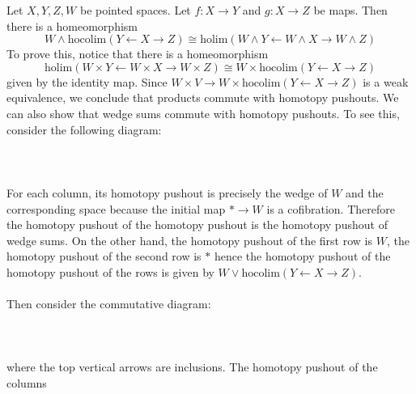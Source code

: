 \documentclass[a4paper]{article}
\begin{document}
\begin{eg}{}{} Let $X,Y,Z,W$ be pointed spaces. Let $f:X\to Y$ and $g:X\to Z$ be maps. Then there is a homeomorphism $$W\wedge\text{hocolim}(Y\leftarrow X\rightarrow Z)\cong\text{holim}(W\wedge Y\leftarrow W\wedge X\rightarrow W\wedge Z)$$ To prove this, notice that there is a homeomorphism $$\text{holim}(W\times Y\leftarrow W\times X\rightarrow W\times Z)\cong W\times\text{hocolim}(Y\leftarrow X\rightarrow Z)$$ given by the identity map. Since $W\times V\to W\times\text{hocolim}(Y\leftarrow X\rightarrow Z)$ is a weak equivalence, we conclude that products commute with homotopy pushouts. We can also show that wedge sums commute with homotopy pushouts. To see this, consider the following diagram: \\~\\
\\~\\
For each column, its homotopy pushout is precisely the wedge of $W$ and the corresponding space because the initial map $\ast\to W$ is a cofibration. Therefore the homotopy pushout of the homotopy pushout is the homotopy pushout of wedge sums. On the other hand, the homotopy pushout of the first row is $W$, the homotopy pushout of the second row is $\ast$ hence the homotopy pushout of the homotopy pushout of the rows is given by $W\vee\text{hocolim}(Y\leftarrow X\rightarrow Z)$. \\~\\

Then consider the commutative diagram: \\~\\
\\~\\
where the top vertical arrows are inclusions. The homotopy pushout of the columns 
\end{eg}
\end{document}
